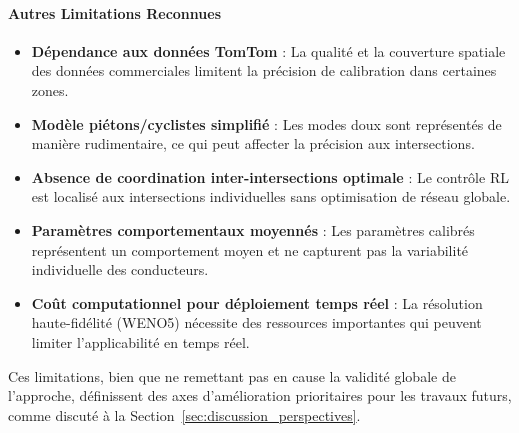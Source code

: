 \paragraph{Autres Limitations Reconnues}
\begin{itemize}
    \item \textbf{Dépendance aux données TomTom} : La qualité et la couverture spatiale des données commerciales limitent la précision de calibration dans certaines zones.
    \item \textbf{Modèle piétons/cyclistes simplifié} : Les modes doux sont représentés de manière rudimentaire, ce qui peut affecter la précision aux intersections.
    \item \textbf{Absence de coordination inter-intersections optimale} : Le contrôle RL est localisé aux intersections individuelles sans optimisation de réseau globale.
    \item \textbf{Paramètres comportementaux moyennés} : Les paramètres calibrés représentent un comportement moyen et ne capturent pas la variabilité individuelle des conducteurs.
    \item \textbf{Coût computationnel pour déploiement temps réel} : La résolution haute-fidélité (WENO5) nécessite des ressources importantes qui peuvent limiter l'applicabilité en temps réel.
\end{itemize}

Ces limitations, bien que ne remettant pas en cause la validité globale de l'approche, définissent des axes d'amélioration prioritaires pour les travaux futurs, comme discuté à la Section~\ref{sec:discussion_perspectives}.

% 


